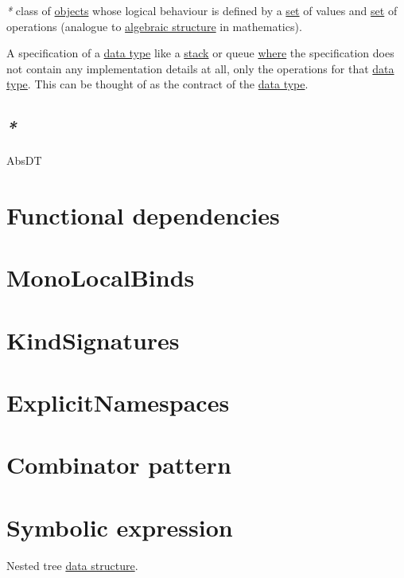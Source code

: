 \documentclass[a4paper,14pt,oneside]{book}
\begin{document}
\emph{*} class of \hyperref[orgca8021e]{objects} whose logical behaviour is defined by a \hyperref[org6b6e43e]{set} of values and \hyperref[org6b6e43e]{set} of operations (analogue to \hyperref[org84c9263]{algebraic structure} in mathematics).

A specification of a \hyperref[org4473799]{data type} like a \hyperref[orgaf1e197]{stack} or queue \hyperref[org3993fb7]{where} the specification does not contain any implementation details at all, only the operations for that \hyperref[org4473799]{data type}. This can be thought of as the contract of the \hyperref[org4473799]{data type}. 

\section{\emph{*}}
\label{sec:org884a9ba}

\label{org8f96869}AbsDT

\chapter{\label{org8fbeb1f}Functional dependencies}
\label{sec:org328da4e}

\chapter{\label{org2225e72}MonoLocalBinds}
\label{sec:org60db1cd}

\chapter{\label{org9842a6e}KindSignatures}
\label{sec:org78b4d6c}

\chapter{\label{org72f2781}ExplicitNamespaces}
\label{sec:org7149085}

\chapter{\label{orge06470e}Combinator pattern}
\label{sec:org3363707}

\chapter{\label{org4a4184c}Symbolic expression}
\label{sec:orgd19b348}
Nested tree \hyperref[org8fcbf29]{data structure}.
\end{document}
